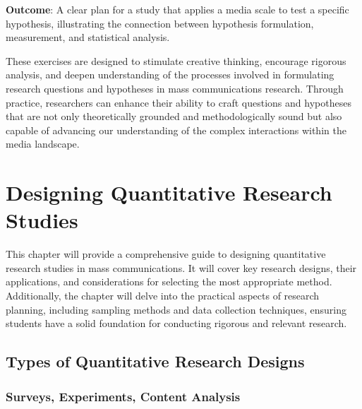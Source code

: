 \documentclass[
]{book}
\begin{document}
\textbf{Outcome}: A clear plan for a study that applies a media scale to test a specific hypothesis, illustrating the connection between hypothesis formulation, measurement, and statistical analysis.

These exercises are designed to stimulate creative thinking, encourage rigorous analysis, and deepen understanding of the processes involved in formulating research questions and hypotheses in mass communications research. Through practice, researchers can enhance their ability to craft questions and hypotheses that are not only theoretically grounded and methodologically sound but also capable of advancing our understanding of the complex interactions within the media landscape.

\hypertarget{designing-quantitative-research-studies}{%
\chapter{Designing Quantitative Research Studies}\label{designing-quantitative-research-studies}}

This chapter will provide a comprehensive guide to designing quantitative research studies in mass communications. It will cover key research designs, their applications, and considerations for selecting the most appropriate method. Additionally, the chapter will delve into the practical aspects of research planning, including sampling methods and data collection techniques, ensuring students have a solid foundation for conducting rigorous and relevant research.

\hypertarget{types-of-quantitative-research-designs}{%
\section*{Types of Quantitative Research Designs}\label{types-of-quantitative-research-designs}}

\hypertarget{surveys-experiments-content-analysis}{%
\subsection*{Surveys, Experiments, Content Analysis}\label{surveys-experiments-content-analysis}}
\end{document}
